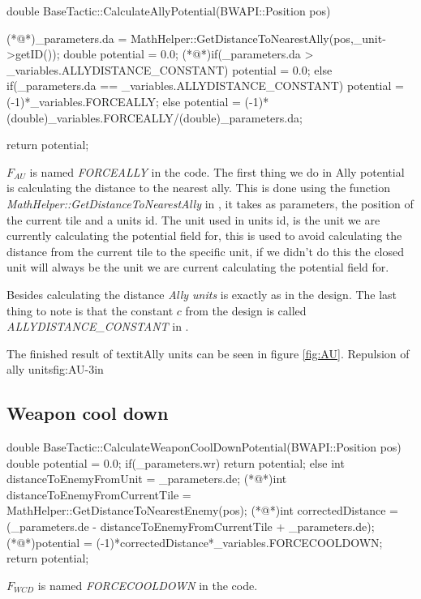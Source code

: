 {	
		\begin{Sourcecode}[caption=Ally units]
double BaseTactic::CalculateAllyPotential(BWAPI::Position pos)
{
	(*@\lnote@*)_parameters.da = MathHelper::GetDistanceToNearestAlly(pos,_unit->getID());
	double potential = 0.0;
	(*@\lnote@*)if(_parameters.da > _variables.ALLYDISTANCE_CONSTANT)
		potential = 0.0;
	else if(_parameters.da == _variables.ALLYDISTANCE_CONSTANT)
		potential = (-1)*_variables.FORCEALLY;
	else
		potential = (-1)*(double)_variables.FORCEALLY/(double)_parameters.da;
	
	return potential;
}
\end{Sourcecode}	
	$F_{AU}$ is named \textit{FORCEALLY} in the code. 
	The first thing we do in Ally potential is calculating the distance to the nearest ally. This is done using the function \textit{MathHelper::GetDistanceToNearestAlly} in , it takes as parameters, the position of the current tile and a units id. The unit used in units id, is the unit we are currently calculating the potential field for, this is used to avoid calculating the distance from the current tile to the  specific unit, if we didn't do this the closed unit will always be the unit we are current calculating the potential field for.
	
	Besides calculating the distance \textit{Ally units} is exactly as in the design. The last thing to note is that the constant $c$ from the design is called \textit{ALLYDISTANCE\_CONSTANT} in .
	
	The finished result of textit{Ally units} can be seen in figure \ref{fig:AU}.
			{Repulsion of ally units}{fig:AU}{-3in}
	
	\subsection{Weapon cool down}
		\begin{Sourcecode}[caption=Weapon cool down]
double BaseTactic::CalculateWeaponCoolDownPotential(BWAPI::Position pos)
{
	double potential = 0.0;
	if(_parameters.wr)
		return potential;
	else
	{
		int distanceToEnemyFromUnit = _parameters.de;
		(*@\lnote@*)int distanceToEnemyFromCurrentTile = MathHelper::GetDistanceToNearestEnemy(pos);
		(*@\lnote@*)int correctedDistance = (_parameters.de - distanceToEnemyFromCurrentTile + _parameters.de);
		(*@\lnote@*)potential = (-1)*correctedDistance*_variables.FORCECOOLDOWN;
		return potential;
	}
}
\end{Sourcecode}		
	$F_{WCD}$ is named \textit{FORCECOOLDOWN} in the code. 
	
}
